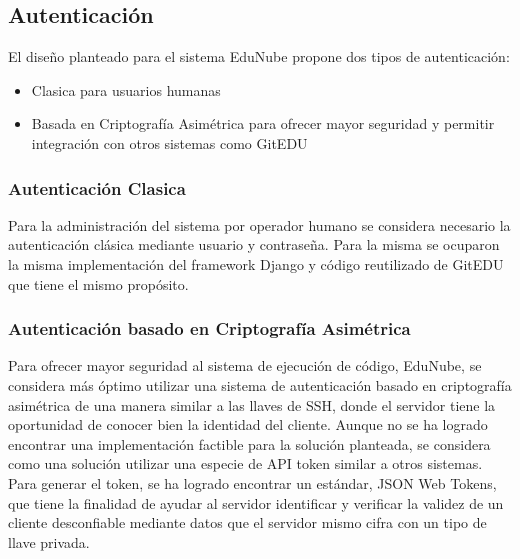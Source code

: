 \subsection{Autenticación}
El diseño planteado para el sistema EduNube propone dos tipos de autenticación:
\begin{itemize}
\item Clasica para usuarios humanas
\item Basada en Criptografía Asimétrica para ofrecer mayor seguridad y permitir integración con otros sistemas como GitEDU
\end{itemize}

\subsubsection{Autenticación Clasica}
Para la administración del sistema por operador humano se considera necesario la autenticación clásica mediante usuario y contraseña. Para la misma se ocuparon la misma implementación del framework Django y código reutilizado de GitEDU que tiene el mismo propósito.

\subsubsection{Autenticación basado en Criptografía Asimétrica}
Para ofrecer mayor seguridad al sistema de ejecución de código, EduNube, se considera más óptimo utilizar una sistema de autenticación basado en criptografía asimétrica de una manera similar a las llaves de SSH, donde el servidor tiene la oportunidad de conocer bien la identidad del cliente. Aunque no se ha logrado encontrar una implementación factible para la solución planteada, se considera como una solución utilizar una especie de API token similar a otros sistemas. Para generar el token, se ha logrado encontrar un estándar, JSON Web Tokens, que tiene la finalidad de ayudar al servidor identificar y verificar la validez de un cliente desconfiable mediante datos que el servidor mismo cifra con un tipo de llave privada.

